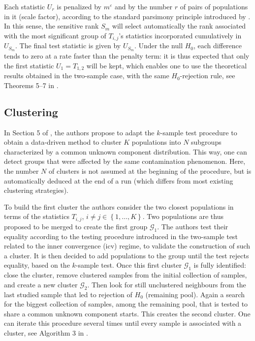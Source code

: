 Each statistic \(U_r\) is penalized by \(m^{\varepsilon}\) and by the number \(r\) of pairs of populations in it (scale factor), according to the standard parsimony principle introduced by \citet{Schwarz:1978}. In this sense, the sensitive rank \(S_m\) will select automatically the rank associated with the most significant group of \(T_{i,j}\)'s statistics incorporated cumulatively in \(U_{S_m}\). The final test statistic is given by \(U_{S_m}\). Under the null \(H_0\), each difference tends to zero at a rate faster than the penalty term: it is thus expected that only the first statistic \(U_1=T_{1,2}\) will be kept, which enables one to use the theoretical results obtained in the two-sample case, with the same \(H_0\)-rejection rule, see Theorems 5--7 in \citet{Milhaud+Pommeret+Salhi+Vandekerkhove:2024b}.

\subsection{Clustering}\label{sec:clusteringAlgo}

In Section 5 of \citet{Milhaud+Pommeret+Salhi+Vandekerkhove:2024b}, the authors propose to adapt the \(k\)-sample test procedure to obtain a data-driven method to cluster \(K\) populations into \(N\) subgroups characterized by a common unknown component distribution. This way, one can detect groups that were affected by the same contamination phenomenon. Here, the number \(N\) of clusters is not assumed at the beginning of the procedure, but is automatically deduced at the end of a run (which differs from most existing clustering strategies).

To build the first cluster the authors consider the two closest populations in terms of the statistics \(T_{i,j}\), \(i\neq j \in \left\{1,\dots, K\right\}\). Two populations are thus proposed to be merged to create the first group \(\mathcal{G}_1\). The authors test their equality according to the testing procedure introduced in the two-sample test related to the inner convergence (icv) regime, to validate the construction of such a cluster. It is then decided to add populations to the group until the test rejects equality, based on the \(k\)-sample test. Once this first cluster \(\mathcal{G}_1\) is fully identified: close the cluster, remove clustered samples from the initial collection of samples, and create a new cluster \(\mathcal{G}_2\). Then look for still unclustered neighbours from the last studied sample that led to rejection of \(H_0\) (remaining pool). Again a search for the biggest collection of samples, among the remaining pool, that is tested to share a common unknown component starts. This creates the second cluster. One can iterate this procedure several times until every sample is associated with a cluster, see Algorithm 3 in \citet{Milhaud+Pommeret+Salhi+Vandekerkhove:2024b}.

